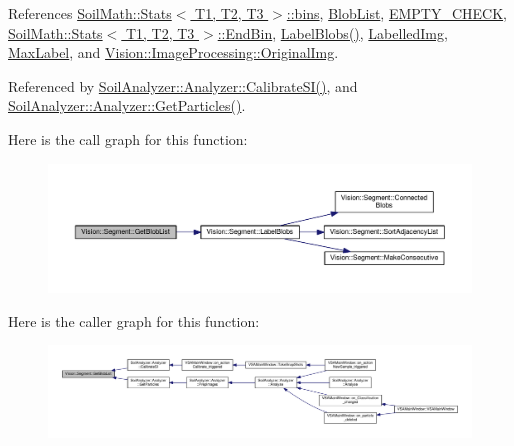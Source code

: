 References \hyperlink{_stats_8h_source_l00044}{Soil\+Math\+::\+Stats$<$ T1, T2, T3 $>$\+::bins}, \hyperlink{_segment_8h_source_l00055}{Blob\+List}, \hyperlink{_image_processing_8h_source_l00022}{E\+M\+P\+T\+Y\+\_\+\+C\+H\+E\+C\+K}, \hyperlink{_stats_8h_source_l00054}{Soil\+Math\+::\+Stats$<$ T1, T2, T3 $>$\+::\+End\+Bin}, \hyperlink{_segment_8cpp_source_l00316}{Label\+Blobs()}, \hyperlink{_segment_8h_source_l00083}{Labelled\+Img}, \hyperlink{_segment_8h_source_l00085}{Max\+Label}, and \hyperlink{_image_processing_8h_source_l00063}{Vision\+::\+Image\+Processing\+::\+Original\+Img}.



Referenced by \hyperlink{analyzer_8cpp_source_l00388}{Soil\+Analyzer\+::\+Analyzer\+::\+Calibrate\+S\+I()}, and \hyperlink{analyzer_8cpp_source_l00303}{Soil\+Analyzer\+::\+Analyzer\+::\+Get\+Particles()}.



Here is the call graph for this function\+:
\nopagebreak
\begin{figure}[H]
\begin{center}
\leavevmode
\includegraphics[width=350pt]{class_vision_1_1_segment_a6dba1b8506fe7e8054e99ea5330d4abc_cgraph}
\end{center}
\end{figure}




Here is the caller graph for this function\+:
\nopagebreak
\begin{figure}[H]
\begin{center}
\leavevmode
\includegraphics[width=350pt]{class_vision_1_1_segment_a6dba1b8506fe7e8054e99ea5330d4abc_icgraph}
\end{center}
\end{figure}


\hypertarget{class_vision_1_1_segment_ad002015511d2d8a4d42106c14e163623}{}
